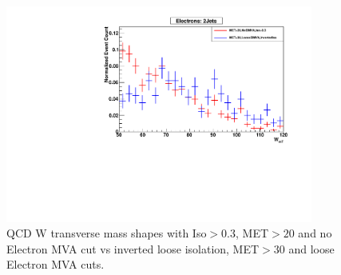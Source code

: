 \begin{figure}[h!] {\centering
{}\linewidth
\includegraphics[width=0.90\textwidth]{plots/qcd/El2J_CutComparison_WmT.pdf}
\caption{ QCD W transverse mass shapes with Iso$>0.3$, MET$>20$ and no Electron MVA cut vs inverted loose isolation, MET$>30$ and loose Electron MVA cuts.}
\label{fig:QCDISOCutsWmTShape}
}
\end{figure}
